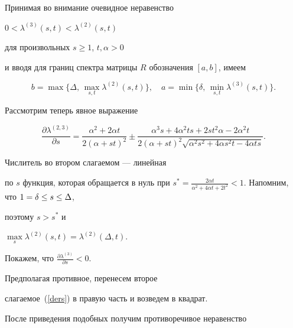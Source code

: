 \begin{pf}


Принимая во внимание очевидное неравенство


$0 < \lambda^{(3)}(s,t) < \lambda^{(2)}(s,t)$


для произвольных $s \geq 1$, $t,\alpha > 0$


и вводя для границ спектра матрицы $R$ обозначения $[a,b]$, имеем


$$


b = \max \{ \Delta, \, \max\limits_{s,t} \lambda^{(2)}(s,t) \} , \quad


a = \min \{ \delta, \, \min\limits_{s,t} \lambda^{(3)}(s,t) \} .


$$





Рассмотрим теперь явное выражение


\begin{equation}


\label{ders}


\dfrac{\partial \lambda^{(2,3)}}{ \partial s} =


\frac{\alpha^2+2\alpha t}{2(\alpha+st)^2} \pm


\frac{\alpha^3s+4\alpha^2ts+2st^2\alpha -2\alpha^2t}


{2(\alpha+st)^2 \sqrt{\alpha^2s^2+4\alpha s^2t-4\alpha ts}} .


\end{equation}


Числитель во втором слагаемом --- линейная


по $s$ функция, которая обращается в нуль при $s^{\ast}


= \frac{2\alpha t}{\alpha^2+


4\alpha t+2t^2} < 1$. Напомним, что $ 1 = \zd \leq s \leq \zD$,


поэтому $ s > s^{\ast} $ и


$\max\limits_s \lambda^{(2)}(s,t)=\lambda^{(2)}(\Delta,t)$.








Покажем, что $\frac{\partial \lambda^{(3)}}{ \partial s} < 0$.


Предполагая противное, перенесем второе


слагаемое~(\ref{ders}) в правую часть и возведем в квадрат.


После приведения подобных получим противоречивое неравенство



\end{pf}
